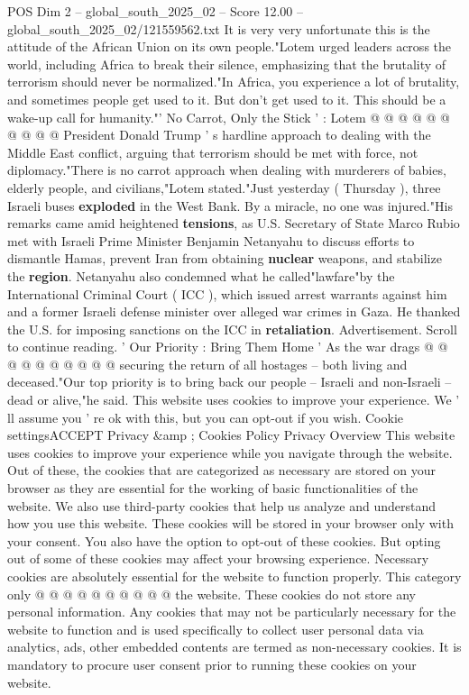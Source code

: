 \begin{textsample}{POS Dim 2 – global\_south\_2025\_02 – Score 12.00 – global\_south\_2025\_02/121559562.txt}
It is very very unfortunate this is the attitude of the African Union on its own people."Lotem urged leaders across the world, including Africa to break their silence, emphasizing that the brutality of terrorism should never be normalized."In Africa, you experience a lot of brutality, and sometimes people get used to it.
But don't get used to it.
This should be a wake-up call for humanity."' No Carrot, Only the Stick ' : Lotem @ @ @ @ @ @ @ @ @ @ President Donald Trump ' s hardline approach to dealing with the Middle East conflict, arguing that terrorism should be met with force, not diplomacy."There is no carrot approach when dealing with murderers of babies, elderly people, and civilians,"Lotem stated."Just yesterday ( Thursday ), three Israeli buses \textbf{exploded} in the West Bank.
By a miracle, no one was injured."His remarks came amid heightened \textbf{tensions}, as U.S.
Secretary of State Marco Rubio met with Israeli Prime Minister Benjamin Netanyahu to discuss efforts to dismantle Hamas, prevent Iran from obtaining \textbf{nuclear} weapons, and stabilize the \textbf{region}.
Netanyahu also condemned what he called"lawfare"by the International Criminal Court ( ICC ), which issued arrest warrants against him and a former Israeli defense minister over alleged war crimes in Gaza.
He thanked the U.S. for imposing sanctions on the ICC in \textbf{retaliation}.
Advertisement.
Scroll to continue reading. ' Our Priority : Bring Them Home ' As the war drags @ @ @ @ @ @ @ @ @ @ securing the return of all hostages -- both living and deceased."Our top priority is to bring back our people -- Israeli and non-Israeli -- dead or alive,"he said.
This website uses cookies to improve your experience.
We ' ll assume you ' re ok with this, but you can opt-out if you wish.
Cookie settingsACCEPT Privacy \&amp ; Cookies Policy Privacy Overview This website uses cookies to improve your experience while you navigate through the website.
Out of these, the cookies that are categorized as necessary are stored on your browser as they are essential for the working of basic functionalities of the website.
We also use third-party cookies that help us analyze and understand how you use this website.
These cookies will be stored in your browser only with your consent.
You also have the option to opt-out of these cookies.
But opting out of some of these cookies may affect your browsing experience.
Necessary cookies are absolutely essential for the website to function properly.
This category only @ @ @ @ @ @ @ @ @ @ the website.
These cookies do not store any personal information.
Any cookies that may not be particularly necessary for the website to function and is used specifically to collect user personal data via analytics, ads, other embedded contents are termed as non-necessary cookies.
It is mandatory to procure user consent prior to running these cookies on your website.

\end{textsample}
